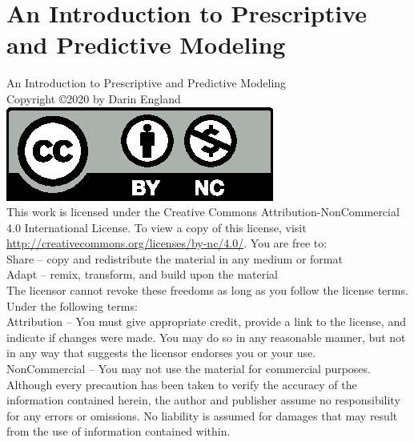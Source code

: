 \documentclass[11pt]{book}
\begin{document}
\frontmatter
%
\chapter*{\Huge \center An Introduction to Prescriptive and Predictive Modeling}
\thispagestyle{empty}
\newpage
\noindent
An Introduction to Prescriptive and Predictive Modeling\\
Copyright \copyright 2020 by Darin England\\
\includegraphics[scale=0.8]{by-nc.eps}\\
This work is licensed under the Creative Commons Attribution-NonCommercial 4.0 International License. To view a copy of this license, visit \url{http://creativecommons.org/licenses/by-nc/4.0/}.
You are free to:\\
Share – copy and redistribute the material in any medium or format\\
Adapt – remix, transform, and build upon the material\\
The licensor cannot revoke these freedoms as long as you follow the license terms.
Under the following terms:\\
Attribution – You must give appropriate credit, provide a link to the license, and indicate if changes were made. You may do so in any reasonable manner, but not in any way that suggests 
the licensor endorses you or your use.\\
NonCommercial – You may not use the material for commercial purposes.\\
Although every precaution has been taken to verify the accuracy of the information
contained herein, the author and publisher assume no responsibility for any errors or
omissions. No liability is assumed for damages that may result from the use of information
contained within.

\tableofcontents

\mainmatter







\backmatter

\nocite{Anderson:2015pnas} %

\printbibliography
\end{document}
